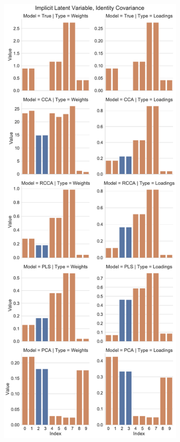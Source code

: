 \begin{figure}
\begin{subfigure}{0.49\linewidth}
\includegraphics[width=\linewidth]{figures/simulated/Combined_Weights_Loadings_with_Error_Bars_Identity_Covariance_implicit.pdf}

\end{subfigure}
\end{figure}
